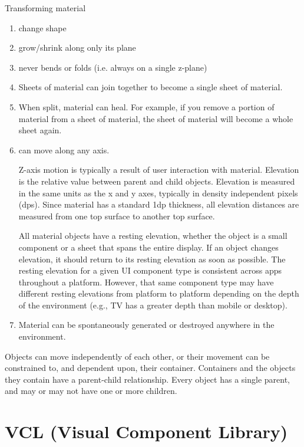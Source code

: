 Transforming material
\begin{enumerate}
  \item change shape
  \item grow/shrink along only its plane
  \item never bends or folds (i.e. always on a single z-plane)
  \item Sheets of material can join together to become a single sheet of
  material.
  \item When split, material can heal. For example, if you remove a portion of
  material from a sheet of material, the sheet of material will become a whole sheet again.
  \item can move along any axis.
  
  Z-axis motion is typically a result of user interaction with material.
  Elevation is the relative value between parent and child objects.
  Elevation is measured in the same units as the x and y axes, typically in
  density independent pixels (dps). Since material has a standard 1dp thickness,
  all elevation distances are measured from one top surface to another top surface. 
  
  All material objects have a resting elevation, whether the object is a small
  component or a sheet that spans the entire display. If an object changes
  elevation, it should return to its resting elevation as soon as possible.
  The resting elevation for a given UI component type is consistent across apps
  throughout a platform. However, that same component type may have different
  resting elevations from platform to platform depending on the depth of the
  environment (e.g., TV has a greater depth than mobile or desktop).  
  
  \item Material can be spontaneously generated or destroyed anywhere in the
  environment.
\end{enumerate}

Objects can move independently of each other, or their movement can be
constrained to, and dependent upon, their container. Containers and the objects
they contain have a parent-child relationship. Every object has a single parent,
and may or may not have one or more children.  

\section{VCL (Visual Component Library)}
\label{sec:VCL}

